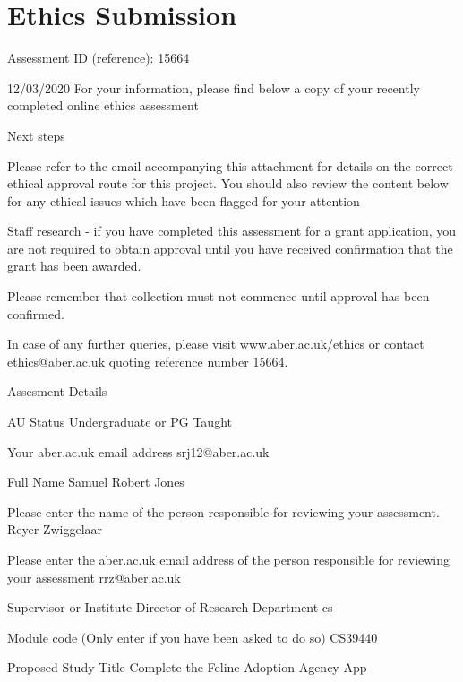 \chapter{Ethics Submission}


Assessment ID (reference): 15664

12/03/2020
For your information, please find below a copy of your
recently completed online ethics assessment

Next steps

Please refer to the email accompanying this attachment for details on the correct ethical
approval route for this project. You should also review the content below for any ethical
issues which have been flagged for your attention

Staff research - if you have completed this assessment for a grant application, you are not
required to obtain approval until you have received confirmation that the grant has been
awarded.

Please remember that collection must not commence until approval has been confirmed.

In case of any further queries, please visit www.aber.ac.uk/ethics or contact
ethics@aber.ac.uk quoting reference number 15664.

Assesment Details

AU Status
Undergraduate or PG Taught

Your aber.ac.uk email address
srj12@aber.ac.uk

Full Name
Samuel Robert Jones

Please enter the name of the person responsible for reviewing your assessment.
Reyer Zwiggelaar

Please enter the aber.ac.uk email address of the person responsible for reviewing
your assessment
rrz@aber.ac.uk

Supervisor or Institute Director of Research Department
cs

Module code (Only enter if you have been asked to do so)
CS39440

Proposed Study Title
Complete the Feline Adoption Agency App

